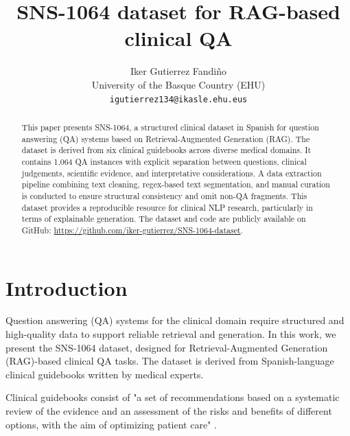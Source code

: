 \documentclass[11pt,a4paper]{article}
\title{SNS-1064 dataset for RAG-based clinical QA}
\author{Iker Gutierrez Fandiño \\
  University of the Basque Country (EHU) \\
  \fontsize{10.5pt}{11pt}\selectfont\texttt{igutierrez134@ikasle.ehu.eus}}\normalsize
\begin{document}
\pagestyle{plain}
\thispagestyle{plain}

\maketitle

\begin{abstract}
This paper presents SNS-1064, a structured clinical dataset in Spanish for question \linebreak answering (QA) systems based on Retrieval-Augmented Generation (RAG). The dataset is derived from six clinical guidebooks across diverse medical domains. It contains 1,064 QA instances with explicit separation \linebreak between questions, clinical judgements, scientific evidence, and interpretative conside\-rations. A data extraction pipeline combi\-ning text cleaning, regex-based text segmentation, and manual curation is conducted to ensure structural consistency and omit non-QA \linebreak fragments.
This dataset provides a reproducible resource for clinical NLP research, particularly in terms of explainable generation. The dataset and code are publicly avai\-lable on GitHub: \url{https://github.com/iker-gutierrez/SNS-1064-dataset}.

\end{abstract}




\section{Introduction}

 Question answering (QA) systems for the clinical domain require structured and high-quality data to support reliable retrieval and generation. In this work, we present the SNS-1064 dataset, designed for Retrieval-Augmented Generation (RAG)-based clinical QA tasks. The dataset is derived from Spanish-language clinical guidebooks written by medical experts.
 
 Clinical guidebooks consist of "a set of \linebreak recommendations based on a systematic review of the evidence and an assessment of the risks and benefits of different options, with the aim of optimizing patient care" \citep{guiasalud}.
\end{document}
